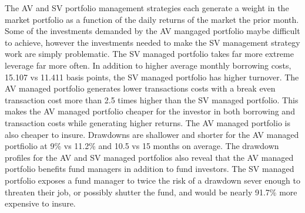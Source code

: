 The AV and SV portfolio management strategies each generate a weight in the market portfolio as a function of the daily returns of the market the prior month. Some of the investments demanded by the AV mangaged portfolio maybe difficult to achieve, however the investments needed to make the SV management strategy work are simply problematic. The SV managed portfolio takes far more extreme leverage far more often. In addition to higher average monthly borrowing costs, 15.107 vs 11.411 basis points, the SV managed portfolio has higher turnover. The AV managed portfolio generates lower transactions costs with a break even transaction cost more than 2.5 times higher than the SV managed portfolio. This makes the AV managed portfolio cheaper for the investor in both borrowing and transaction costs while generating higher returns. The AV managed portfolio is also cheaper to insure. Drawdowns are shallower and shorter for the AV managed portfiolio at 9\% vs 11.2\% and 10.5 vs 15 months on average. The drawdown profiles for the AV and SV managed portfolios also reveal that the AV managed portfolio benefits fund managers in addition to fund investors. The SV managed portfolio exposes a fund manager to twice the risk of a drawdown sever enough to threaten their job, or possibly shutter the fund, and would be nearly 91.7\% more expensive to insure. 



